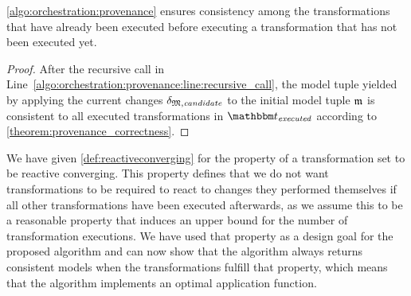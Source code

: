 \begin{theorem}
    \autoref{algo:orchestration:provenance} ensures consistency among the transformations that have already been executed before executing a transformation that has not been executed yet.
\end{theorem}
\begin{proof}
	After the recursive call in Line~\ref{algo:orchestration:provenance:line:recursive_call}, the model tuple yielded by applying the current changes $\changetuple{\metamodeltuple{M},\mathvariable{candidate}}$ to the initial model tuple $\modeltuple{m}$ is consistent to all executed transformations in $\provalgexecuted$ according to \autoref{theorem:provenance_correctness}. %
\end{proof}	

We have given \autoref{def:reactiveconverging} for the property of a transformation set to be reactive converging.
This property defines that we do not want transformations to be required to react to changes they performed themselves if all other transformations have been executed afterwards, as we assume this to be a reasonable property that induces an upper bound for the number of transformation executions.
We have used that property as a design goal for the proposed algorithm and can now show that the algorithm always returns consistent models when the transformations fulfill that property, which means that the algorithm implements an optimal application function.

